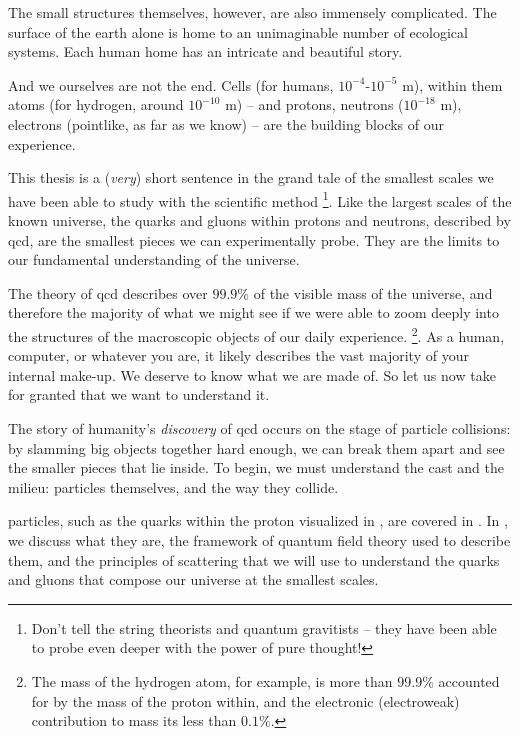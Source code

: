 The small structures themselves, however, are also immensely complicated.
%
The surface of the earth alone is home to an unimaginable number of ecological systems.
%
Each human home has an intricate and beautiful story.

And we ourselves are not the end.
%
Cells (for humans, \(10^{-4}\)-\(10^{-5}\) m), within them atoms (for hydrogen, around \(10^{-10}\) m) -- and protons, neutrons (\(10^{-18}\) m), electrons (pointlike, as far as we know) -- are the building blocks of our experience.

This thesis is a (\textit{very}) short sentence in the grand tale of the smallest scales we have been able to study with the scientific method%
\footnote{
    Don't tell the string theorists and quantum gravitists -- they have been able to probe even deeper with the power of pure thought!
}.
%
Like the largest scales of the known universe, the quarks and gluons within protons and neutrons, described by \gls{qcd}, are the smallest pieces we can experimentally probe.
%
They are the limits to our fundamental understanding of the universe.

The theory of \gls{qcd} describes over \(99.9\%\) of the visible mass of the universe, and therefore the majority of what we might see if we were able to zoom deeply into the structures of the macroscopic objects of our daily experience.%
\footnote{
    The mass of the hydrogen atom, for example, is more than \(99.9\%\) accounted for by the mass of the proton within, and the electronic (electroweak) contribution to mass its less than \(0.1\%\).
}.
%
As a human, computer, or whatever you are, it likely describes the vast majority of your internal make-up.
%
We deserve to know what we are made of.
%
So let us now take for granted that we want to understand it.


The story of humanity's \textit{discovery} of \gls{qcd} occurs on the stage of particle collisions:
%
by slamming big objects together hard enough, we can break them apart and see the smaller pieces that lie inside.
%
To begin, we must understand the cast and the milieu:
%
particles themselves, and the way they collide.


\Glspl{particle}, such as the quarks within the proton visualized in , are covered in .
%
In , we discuss what they are, the framework of quantum field theory used to describe them, and the principles of scattering that we will use to understand the quarks and gluons that compose our universe at the smallest scales.

